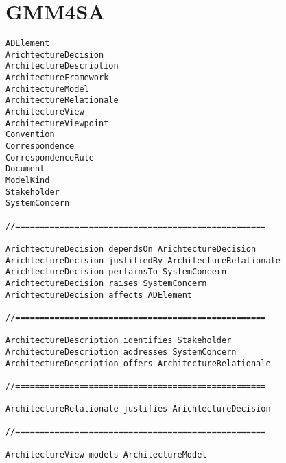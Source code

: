 \section{GMM4SA}

\begin{verbatim}
ADElement
ArichtectureDecision
ArchitectureDescription
ArchitectureFramework
ArchitectureModel
ArchitectureRelationale
ArchitectureView
ArchitectureViewpoint
Convention
Correspondence
CorrespondenceRule
Document
ModelKind
Stakeholder
SystemConcern

//===================================================

ArichtectureDecision dependsOn ArichtectureDecision
ArichtectureDecision justifiedBy ArchitectureRelationale
ArichtectureDecision pertainsTo SystemConcern
ArichtectureDecision raises SystemConcern
ArichtectureDecision affects ADElement

//===================================================

ArchitectureDescription identifies Stakeholder
ArchitectureDescription addresses SystemConcern
ArchitectureDescription offers ArchitectureRelationale

//===================================================

ArchitectureRelationale justifies ArichtectureDecision

//===================================================

ArchitectureView models ArchitectureModel

\end{verbatim}